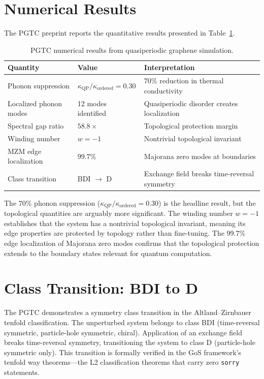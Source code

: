 \documentclass[12pt,letterpaper]{report}
\begin{document}
\section{Numerical Results}

The PGTC preprint reports the quantitative results presented in Table~\ref{tab:pgtc}.

\begin{table}[ht]
\centering
\caption{PGTC numerical results from quasiperiodic graphene simulation.}
\label{tab:pgtc}
\small
\begin{tabularx}{\textwidth}{l l X}
\toprule
\textbf{Quantity} & \textbf{Value} & \textbf{Interpretation} \\
\midrule
\rowcolor{proved}
Phonon suppression & $\kappa_\mathrm{QP}/\kappa_\mathrm{ordered} = 0.30$ & 70\% reduction in thermal conductivity \\
\rowcolor{demonstrated}
Localized phonon modes & 12 modes identified & Quasiperiodic disorder creates localization \\
\rowcolor{proved}
Spectral gap ratio & $58.8\times$ & Topological protection margin \\
\rowcolor{demonstrated}
Winding number & $w = -1$ & Nontrivial topological invariant \\
\rowcolor{proved}
MZM edge localization & 99.7\% & Majorana zero modes at boundaries \\
\rowcolor{demonstrated}
Class transition & BDI $\to$ D & Exchange field breaks time-reversal symmetry \\
\bottomrule
\end{tabularx}
\end{table}

The 70\% phonon suppression ($\kappa_\mathrm{QP}/\kappa_\mathrm{ordered} = 0.30$) is the headline result, but the topological quantities are arguably more significant. The winding number $w = -1$ establishes that the system has a nontrivial topological invariant, meaning its edge properties are protected by topology rather than fine-tuning. The 99.7\% edge localization of Majorana zero modes confirms that the topological protection extends to the boundary states relevant for quantum computation.

\section{Class Transition: BDI to D}

The PGTC demonstrates a symmetry class transition in the Altland--Zirnbauer tenfold classification. The unperturbed system belongs to class BDI (time-reversal symmetric, particle-hole symmetric, chiral). Application of an exchange field breaks time-reversal symmetry, transitioning the system to class D (particle-hole symmetric only). This transition is formally verified in the GoS framework's tenfold way theorems---the L2 classification theorems that carry zero \texttt{sorry} statements.
\end{document}
